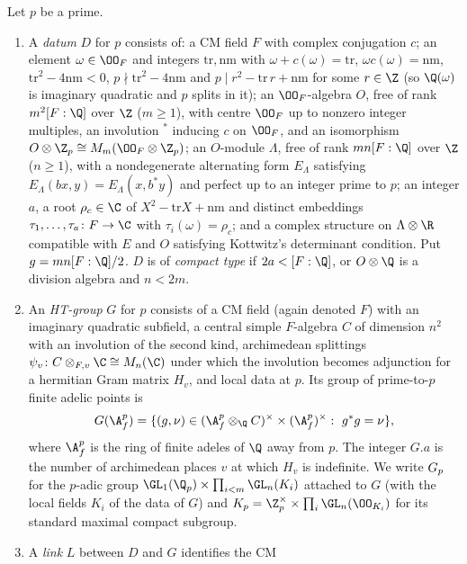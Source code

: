 \begin{definition}\label{pf:ks2:def:datum}
Let $p$ be a prime.
\begin{enumerate}
\item A \emph{datum} $D$ for $p$ consists of: a CM field
  $F$ with complex conjugation $c$; an element $\omega\in\kstwoOF$ and integers $\mathrm{tr},\mathrm{nm}$
  with $\omega+c(\omega)=\mathrm{tr}$, $\omega c(\omega)=\mathrm{nm}$, $\mathrm{tr}^2-4\mathrm{nm}<0$,
  $p\nmid\mathrm{tr}^2-4\mathrm{nm}$ and $p\mid r^2-\mathrm{tr}\,r+\mathrm{nm}$ for some $r\in\Z$
  (so $\Q(\omega)$ is imaginary quadratic and $p$ splits in it); an $\kstwoOF$-algebra $O$, free
  of rank $m^2[F:\Q]$ over $\Z$ ($m\ge1$), with centre $\kstwoOF$ up to nonzero integer multiples,
  an involution ${}^*$ inducing $c$ on $\kstwoOF$, and an isomorphism
  $O\otimes\Z_p\cong M_m(\kstwoOF\otimes\Z_p)$; an $O$-module $\Lambda$, free of rank
  $mn[F:\Q]$ over $\Z$ ($n\ge1$), with a nondegenerate alternating form $E_\Lambda$ satisfying
  $E_\Lambda(bx,y)=E_\Lambda(x,b^*y)$ and perfect up to an integer prime to $p$; an integer $a$, a root
  $\rho_c\in\C$ of $X^2-\mathrm{tr}X+\mathrm{nm}$ and distinct embeddings
  $\tau_1,\dots,\tau_a\colon F\to\C$ with $\tau_i(\omega)=\rho_c$; and a complex structure on
  $\Lambda\otimes\R$ compatible with $E$ and $O$ satisfying Kottwitz's determinant condition.
  Put $g=mn[F:\Q]/2$. $D$ is of \emph{compact type} if $2a<[F:\Q]$, or $O\otimes\Q$ is a division
  algebra and $n<2m$.
\item An \emph{HT-group} $G$ for $p$ consists of a CM
  field (again denoted $F$) with an imaginary quadratic subfield, a central simple $F$-algebra $C$
  of dimension $n^2$ with an involution of the second kind, archimedean splittings
  $\psi_v\colon C\otimes_{F,v}\C\cong M_n(\C)$ under which the involution becomes adjunction for
  a hermitian Gram matrix $H_v$, and local data at $p$. Its group of prime-to-$p$ finite adelic
  points is
  \[
   \kstwoG=\{(g,\nu)\in(\A_f^p\otimes_\Q C)^\times\times(\A_f^p)^\times:\ g^*g=\nu\},
  \]
  where $\A_f^p$ is the ring of finite adeles of $\Q$ away
  from $p$. The integer $G.a$ is the number of archimedean places $v$ at which $H_v$ is
  indefinite. We write $G_{p}$ for the $p$-adic group $\GL_1(\Q_p)\times\prod_{i<m}\GL_n(K_i)$
  attached to $G$ (with the local fields $K_i$ of the data of
  $G$) and $\kstwoKp=\Z_p^\times\times\prod_i\GL_n(\OO_{K_i})$ for its standard maximal compact
  subgroup.
\item A \emph{link} $L$ between $D$ and $G$ identifies the CM

\end{enumerate}
\end{definition}

